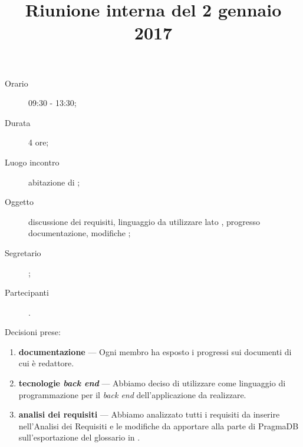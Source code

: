 


\author{\PB}
\supervisor{\MM}
\dest{\ALL}
\title{Riunione interna del 2 gennaio 2017}



\maketitle

\begin{description}
	\item[Orario] 09:30 - 13:30;
	\item[Durata] 4 ore;
	\item[Luogo incontro] abitazione di \PB;
	\item[Oggetto] discussione dei requisiti, linguaggio da utilizzare lato , progresso documentazione, modifiche ;
	\item[Segretario] \PB; 
	\item[Partecipanti] \ALL.
\end{description}

Decisioni prese:
\begin{enumerate}
	\item \textbf{documentazione} --- Ogni membro ha esposto i progressi sui documenti di cui è redattore.
	\item \textbf{tecnologie \emph{back end}} --- Abbiamo deciso di utilizzare  come linguaggio di programmazione per il \emph{back end} dell'applicazione da realizzare.
	\item \textbf{analisi dei requisiti} --- Abbiamo analizzato tutti i requisiti da inserire nell'Analisi dei Requisiti e le modifiche da apportare alla parte  di PragmaDB sull'esportazione del glossario in .
\end{enumerate}


